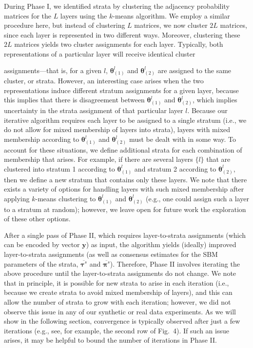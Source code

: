 During Phase I, we identified strata by clustering the adjacency probability matrices for the $L$ layers using the $k$-means algorithm. We employ a similar procedure here, but instead of clustering $L$ matrices, we now cluster $2L$ matrices, since each layer is represented in two different ways. Moreover, clustering these $2L$ matrices yields two cluster assignments for each layer. Typically, both representations of a particular layer will receive identical cluster {assignments---that is, for a given $l$, ${\boldsymbol{\theta}}^{l}_{(1)}$ and ${\boldsymbol{\theta}}^{l}_{(2)}$ are assigned to the same cluster, or strata. However, an interesting case arises when the two representations induce different stratum assignments for a given layer, because this implies that there is disagreement between ${\boldsymbol{\theta}}^{l}_{(1)}$ and ${\boldsymbol{\theta}}^{l}_{(2)}$, which implies uncertainty in the strata assignment of that particular layer $l$.
Because our iterative algorithm requires each layer to be assigned to a single stratum (i.e., we do not allow for mixed membership of layers into strata), layers with mixed membership according to ${\boldsymbol{\theta}}^{l}_{(1)}$ and ${\boldsymbol{\theta}}^{l}_{(2)}$ must be dealt with in some way. To account for these situations, we define additional strata for each combination of membership that arises. For example, if there are several layers $\{l\}$ that are clustered into stratum 1 according to ${\boldsymbol{\theta}}^{l}_{(1)}$ and stratum 2 according to ${\boldsymbol{\theta}}^{l}_{(2)}$, then we define a new stratum that contains only these layers. We note that there exists a variety of options for handling layers with such mixed membership after applying $k$-means clustering to ${\boldsymbol{\theta}}^{l}_{(1)}$ and ${\boldsymbol{\theta}}^{l}_{(2)}$ (e.g., one could assign such a layer to a stratum at random); however, we leave open for future work the exploration of these other options.

After a single pass of Phase II, which requires layer-to-strata assignments (which can be encoded by vector $\boldsymbol y$) as input, the algorithm yields (ideally) improved layer-to-strata assignments (as well as consensus estimates for the SBM parameters of the strata, $\overline{{\boldsymbol \tau}^{s}}$ and $\overline{{\boldsymbol \pi}^{s}}$). Therefore, Phase II involves iterating the above procedure until the layer-to-strata assignments do not change. We note that in principle, it is possible for new strata to arise in each iteration (i.e., because we create strata to avoid mixed membership of layers), and this can allow the number of strata to grow with each iteration; however, we did not observe this issue in any of our synthetic or real data experiments. As we will show in the following section, convergence is typically observed after just a few iterations (e.g., see, for example, the second row of Fig.~4). If such an issue arises, it may be helpful to bound the number of iterations in Phase II. 

}
